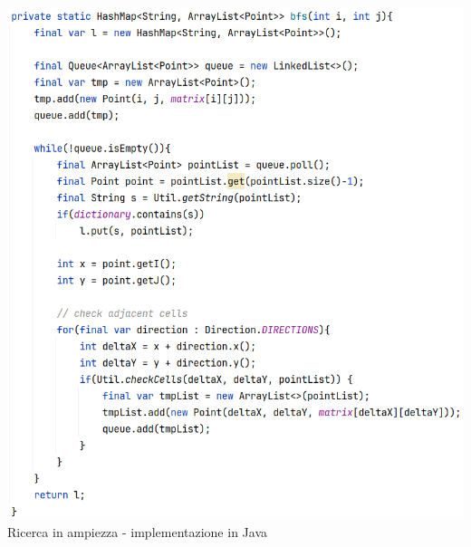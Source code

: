 \documentclass[10pt,a4paper]{article}
\begin{document}
	\begin{center}
		\includegraphics[width=1\textwidth]{bfs}
		Ricerca in ampiezza - implementazione in Java
		\newpage
	\end{center}
\end{document}
